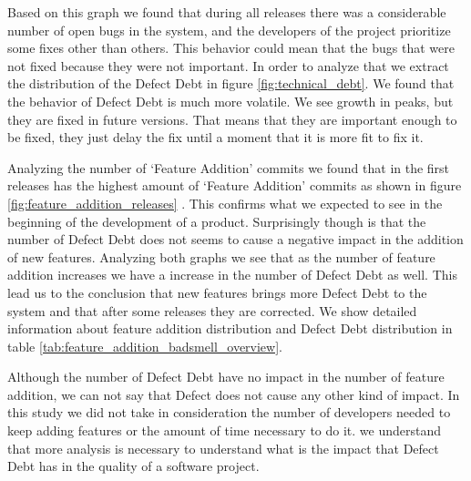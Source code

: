 Based on this graph we found that during all releases there was a considerable number of open bugs in the system, and the developers of the project prioritize some fixes other than others. This behavior could mean that the bugs that were not fixed because they were not important. In order to analyze that we extract the distribution of the Defect Debt in figure \ref{fig:technical_debt}. We found that the behavior of Defect Debt is much more volatile. We see growth in peaks, but they are fixed in future versions. That means that they are important enough to be fixed, they just delay the fix until a moment that it is more fit to fix it. 

Analyzing the number of `Feature Addition' commits we found that in the first releases has the highest amount of `Feature Addition' commits as shown in figure \ref{fig:feature_addition_releases} . This confirms what we expected to see in the beginning of the development of a product. Surprisingly though is that the number of Defect Debt does not seems to cause a negative impact in the addition of new features. Analyzing both graphs we see that as the number of feature addition increases we have a increase in the number of Defect Debt as well. This lead us to the conclusion that new features brings more Defect Debt to the system and that after some releases they are corrected. We show detailed information about feature addition distribution and Defect Debt distribution in table \ref{tab:feature_addition_badsmell_overview}. 

Although the number of Defect Debt have no impact in the number of feature addition, we can not say that Defect does not cause any other kind of impact. In this study we did not take in consideration the number of developers needed to keep adding features or the amount of time necessary to do it. we understand that more analysis is necessary to understand what is the impact that Defect Debt has in the quality of a software project.

\vspace{1mm}
\vspace{1mm}

